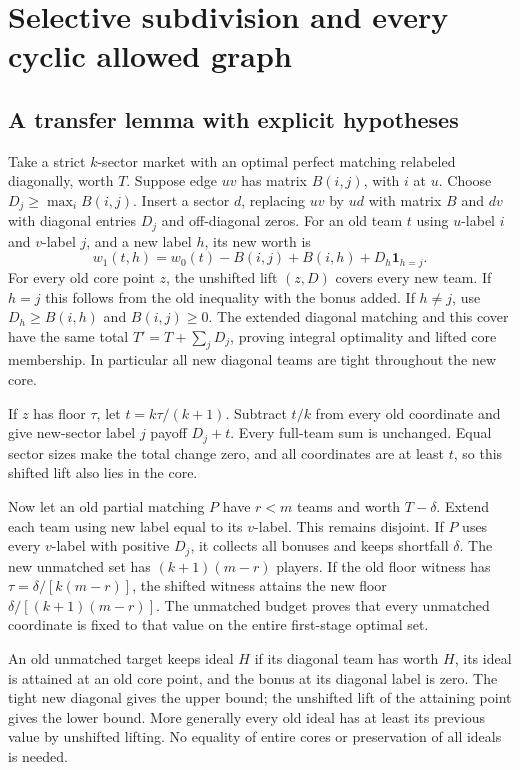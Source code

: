 \documentclass[11pt]{article}
\theoremstyle{remark}\newtheorem{remark}[theorem]{Remark}
\begin{document}
\section{Selective subdivision and every cyclic allowed graph}
\subsection{A transfer lemma with explicit hypotheses}
Take a strict $k$-sector market with an optimal perfect matching relabeled
diagonally, worth $T$. Suppose edge $uv$ has matrix $B(i,j)$, with $i$ at $u$.
Choose $D_j\ge\max_i B(i,j)$. Insert a sector $d$, replacing $uv$ by
$ud$ with matrix $B$ and $dv$ with diagonal entries $D_j$ and off-diagonal
zeros. For an old team $t$ using $u$-label $i$ and $v$-label $j$, and a new
label $h$, its new worth is
\[
 w_1(t,h)=w_0(t)-B(i,j)+B(i,h)+D_h\mathbf1_{h=j}.
\]
For every old core point $z$, the unshifted lift $(z,D)$ covers every new
team. If $h=j$ this follows from the old inequality with the bonus added.
If $h\ne j$, use $D_h\ge B(i,h)$ and $B(i,j)\ge0$.
The extended diagonal matching and this cover have the same total
$T'=T+\sum_jD_j$, proving integral optimality and lifted core membership.
In particular all new diagonal teams are tight throughout the new core.

If $z$ has floor $\tau$, let $t=k\tau/(k+1)$. Subtract $t/k$ from every old
coordinate and give new-sector label $j$ payoff $D_j+t$. Every full-team
sum is unchanged. Equal sector sizes make the total change zero, and all
coordinates are at least $t$, so this shifted lift also lies in the core.

Now let an old partial matching $P$ have $r<m$ teams and worth $T-\delta$.
Extend each team using new label equal to its $v$-label. This remains
disjoint. If $P$ uses every $v$-label with positive $D_j$, it collects all
bonuses and keeps shortfall $\delta$. The new unmatched set has
$(k+1)(m-r)$ players. If the old floor witness has
$\tau=\delta/[k(m-r)]$, the shifted witness attains the new floor
$\delta/[(k+1)(m-r)]$. The unmatched budget proves that every unmatched
coordinate is fixed to that value on the entire first-stage optimal set.

An old unmatched target keeps ideal $H$ if its diagonal team has worth
$H$, its ideal is attained at an old core point, and the bonus at its
diagonal label is zero. The tight new diagonal gives the upper bound;
the unshifted lift of the attaining point gives the lower bound. More
generally every old ideal has at least its previous value by unshifted
lifting. No equality of entire cores or preservation of all ideals is needed.
\end{document}
